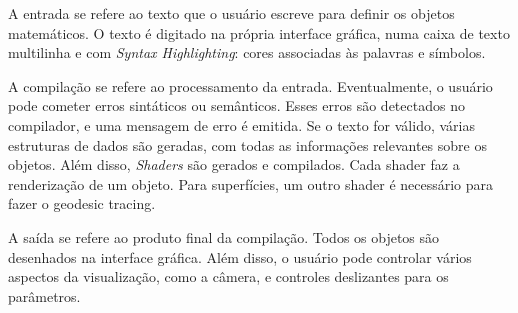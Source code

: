 A entrada se refere ao texto que o usuário escreve para definir os objetos matemáticos.
O texto é digitado na própria interface gráfica, numa caixa de texto multilinha
e com \textit{Syntax Highlighting}: cores associadas às palavras e símbolos.

A compilação se refere ao processamento da entrada.
Eventualmente, o usuário pode cometer erros sintáticos ou semânticos.
Esses erros são detectados no compilador, e uma mensagem de erro é emitida.
Se o texto for válido, várias estruturas de dados são geradas,
com todas as informações relevantes sobre os objetos. Além disso,
\textit{Shaders} são gerados e compilados.
Cada shader faz a renderização de um objeto.
Para superfícies, um outro shader é necessário para fazer o geodesic tracing.

A saída se refere ao produto final da compilação.
Todos os objetos são desenhados na interface gráfica.
Além disso, o usuário pode controlar vários aspectos da visualização,
como a câmera, e controles deslizantes para os parâmetros.